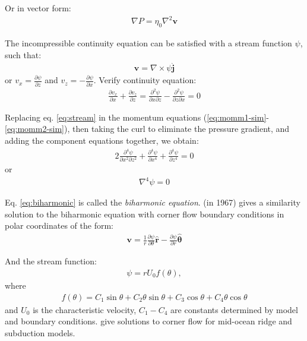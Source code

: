 \documentclass[a4paper,11pt]{article}
\begin{document}
Or in vector form:
\begin{align}
\nabla P = \eta_0\nabla^2\textbf{v} \label{eq:redpressure}
\end{align}

The incompressible continuity equation can be satisfied with a stream function $\psi$, such that:
\begin{align}
\textbf{v} = \nabla\times\psi\hat{\textbf{j}} \label{eq:stream}
\end{align}
or $v_x = \frac{\partial\psi}{\partial z}$ and $v_z = -\frac{\partial\psi}{\partial x}$. Verify continuity equation:
\begin{align}
\frac{\displaystyle \partial v_x}{\displaystyle \partial x}+\frac{\displaystyle \partial v_z}{\displaystyle \partial z} = \frac{\partial^2\psi}{\partial x\partial z}-\frac{\partial^2\psi}{\partial z\partial x} = 0
\end{align}

Replacing eq. \ref{eq:stream} in the momentum equations (\ref{eq:momm1-sim}-\ref{eq:momm2-sim}), then taking the curl to eliminate the pressure gradient, and adding the component equations together, we obtain:
\begin{align}
2\frac{\partial^4\psi}{\partial x^2\partial z^2}+\frac{\partial^4\psi}{\partial x^4}+\frac{\partial^4\psi}{\partial z^4} = 0
\end{align}
or 
\begin{align}
\nabla^4\psi= 0 \label{eq:biharmonic}
\end{align}

Eq. \ref{eq:biharmonic} is called the \textit{biharmonic equation}. \citet{Batchelor2000} (in 1967) gives a similarity solution to the biharmonic equation with corner flow boundary conditions in polar coordinates of the form:
\begin{align}
\textbf{v} = \frac{1}{r}\frac{\partial\psi}{\partial\theta}\hat{\textbf{r}}-\frac{\partial\psi}{\partial r}\hat{\bm{\theta}} \label{eq:velpolar}
\end{align}

And the stream function:
\begin{align}
\psi = r U_0 f(\theta),
\end{align}
where
\begin{align}
f(\theta) = C_1\sin\theta+C_2\theta\sin\theta+C_3\cos\theta+C_4\theta\cos\theta
\end{align}
and $U_0$ is the characteristic velocity, $C_1-C_4$ are constants determined by model and boundary conditions. \citet{Spiegelman1987} give solutions to corner flow for mid-ocean ridge and subduction models. 
\end{document}
